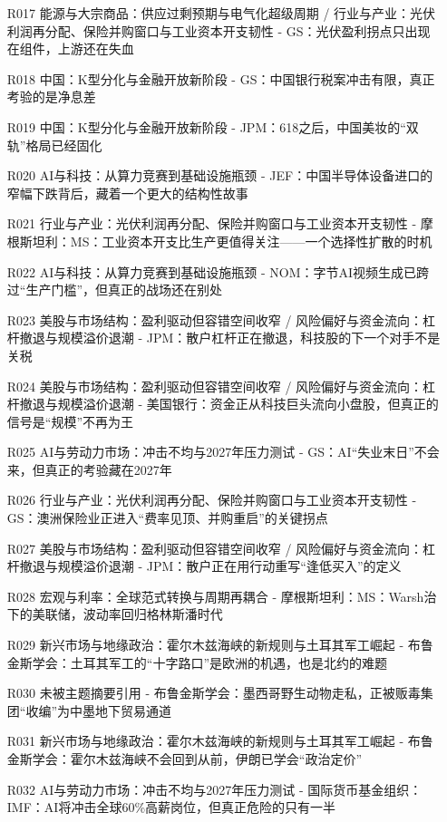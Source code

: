 \documentclass[11pt]{ctexart}
\begin{document}
\begin{itemize}
  \item [R017] 能源与大宗商品：供应过剩预期与电气化超级周期 / 行业与产业：光伏利润再分配、保险并购窗口与工业资本开支韧性 - GS：光伏盈利拐点只出现在组件，上游还在失血
  \item [R018] 中国：K型分化与金融开放新阶段 - GS：中国银行税案冲击有限，真正考验的是净息差
  \item [R019] 中国：K型分化与金融开放新阶段 - JPM：618之后，中国美妆的“双轨”格局已经固化
  \item [R020] AI与科技：从算力竞赛到基础设施瓶颈 - JEF：中国半导体设备进口的窄幅下跌背后，藏着一个更大的结构性故事
  \item [R021] 行业与产业：光伏利润再分配、保险并购窗口与工业资本开支韧性 - 摩根斯坦利：MS：工业资本开支比生产更值得关注——一个选择性扩散的时机
  \item [R022] AI与科技：从算力竞赛到基础设施瓶颈 - NOM：字节AI视频生成已跨过“生产门槛”，但真正的战场还在别处
  \item [R023] 美股与市场结构：盈利驱动但容错空间收窄 / 风险偏好与资金流向：杠杆撤退与规模溢价退潮 - JPM：散户杠杆正在撤退，科技股的下一个对手不是关税
  \item [R024] 美股与市场结构：盈利驱动但容错空间收窄 / 风险偏好与资金流向：杠杆撤退与规模溢价退潮 - 美国银行：资金正从科技巨头流向小盘股，但真正的信号是“规模”不再为王
  \item [R025] AI与劳动力市场：冲击不均与2027年压力测试 - GS：AI“失业末日”不会来，但真正的考验藏在2027年
  \item [R026] 行业与产业：光伏利润再分配、保险并购窗口与工业资本开支韧性 - GS：澳洲保险业正进入“费率见顶、并购重启”的关键拐点
  \item [R027] 美股与市场结构：盈利驱动但容错空间收窄 / 风险偏好与资金流向：杠杆撤退与规模溢价退潮 - JPM：散户正在用行动重写“逢低买入”的定义
  \item [R028] 宏观与利率：全球范式转换与周期再耦合 - 摩根斯坦利：MS：Warsh治下的美联储，波动率回归格林斯潘时代
  \item [R029] 新兴市场与地缘政治：霍尔木兹海峡的新规则与土耳其军工崛起 - 布鲁金斯学会：土耳其军工的“十字路口”是欧洲的机遇，也是北约的难题
  \item [R030] 未被主题摘要引用 - 布鲁金斯学会：墨西哥野生动物走私，正被贩毒集团“收编”为中墨地下贸易通道
  \item [R031] 新兴市场与地缘政治：霍尔木兹海峡的新规则与土耳其军工崛起 - 布鲁金斯学会：霍尔木兹海峡不会回到从前，伊朗已学会“政治定价”
  \item [R032] AI与劳动力市场：冲击不均与2027年压力测试 - 国际货币基金组织：IMF：AI将冲击全球60\%高薪岗位，但真正危险的只有一半

\end{itemize}
\end{document}
